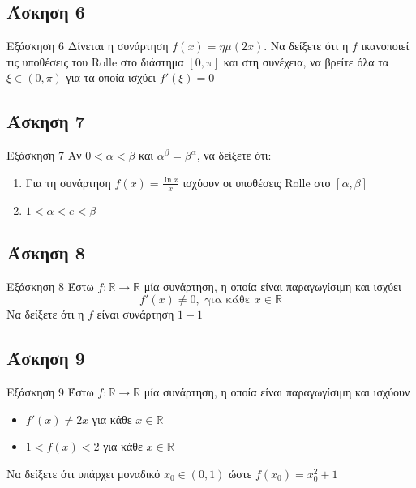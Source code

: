 \documentclass[greek]{beamer}
\begin{document}
\subsection{Άσκηση 6}
\begin{frame}[label=Άσκηση6]{Εξάσκηση 6}
  Δίνεται η συνάρτηση $f(x)=ημ(2x)$. Να δείξετε ότι η $f$ ικανοποιεί τις υποθέσεις του Rolle στο διάστημα $[0,π]$ και στη συνέχεια, να βρείτε όλα τα $ξ\in (0,π)$ για τα οποία ισχύει $f'(ξ)=0$
\end{frame}

\subsection{Άσκηση 7}
\begin{frame}[label=Άσκηση7]{Εξάσκηση 7}
  Αν $0<α<β$ και $α^β=β^α$, να δείξετε ότι:
  \begin{enumerate}
    \item<1-> Για τη συνάρτηση $f(x)=\frac{\ln x}{x}$ ισχύουν οι υποθέσεις Rolle στο $[α,β]$
    \item<2-> $1<α<e<β$
  \end{enumerate}
\end{frame}

\subsection{Άσκηση 8}
\begin{frame}[label=Άσκηση8]{Εξάσκηση 8}
  Έστω $f:\mathbb{R}\to\mathbb{R}$ μία συνάρτηση, η οποία είναι παραγωγίσιμη και ισχύει
  $$f'(x)\ne 0, \text{ για κάθε } x\in\mathbb{R}$$
  Να δείξετε ότι η $f$ είναι συνάρτηση $1-1$
\end{frame}

\subsection{Άσκηση 9}
\begin{frame}[label=Άσκηση9]{Εξάσκηση 9}
  Έστω $f:\mathbb{R}\to\mathbb{R}$ μία συνάρτηση, η οποία είναι παραγωγίσιμη και ισχύουν
  \begin{itemize}
    \item $f'(x)\ne 2x$ για κάθε $x\in\mathbb{R}$
    \item $1<f(x)<2$ για κάθε $x\in\mathbb{R}$
  \end{itemize}
  Να δείξετε ότι υπάρχει μοναδικό $x_0\in (0,1)$ ώστε $f(x_0)=x_0^2+1$
\end{frame}
\end{document}
